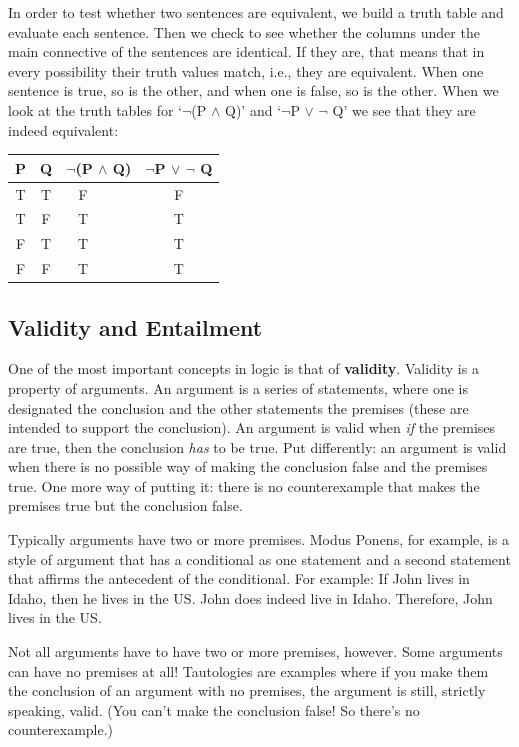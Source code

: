 \documentclass[]{tufte-book}
\begin{document}
In order to test whether two sentences are equivalent, we build a truth table and evaluate each sentence. Then we check to see whether the columns under the main connective of the sentences are identical. If they are, that means that in every possibility their truth values match, i.e., they are equivalent. When one sentence is true, so is the other, and when one is false, so is the other. When we look at the truth tables for `\(\neg\)(P \(\wedge\) Q)' and `\(\neg\)P \(\vee\) \(\neg\) Q' we see that they are indeed equivalent:

\begin{longtable}[]{@{}cccc@{}}
\toprule
P & Q & \(\neg\)(P \(\wedge\) Q) & \(\neg\)P \(\vee\) \(\neg\) Q\tabularnewline
\midrule
\endhead
T & T & F\(~~~~~~~~~~\) & F\tabularnewline
T & F & T\(~~~~~~~~~~\) & T\tabularnewline
F & T & T\(~~~~~~~~~~\) & T\tabularnewline
F & F & T\(~~~~~~~~~~\) & T\tabularnewline
\bottomrule
\end{longtable}

\hypertarget{validity-and-entailment}{%
\subsection{Validity and Entailment}\label{validity-and-entailment}}

One of the most important concepts in logic is that of \textbf{validity}. Validity is a property of arguments. An argument is a series of statements, where one is designated the conclusion and the other statements the premises (these are intended to support the conclusion). An argument is valid when \emph{if} the premises are true, then the conclusion \emph{has} to be true. Put differently: an argument is valid when there is no possible way of making the conclusion false and the premises true. One more way of putting it: there is no counterexample that makes the premises true but the conclusion false.

Typically arguments have two or more premises. Modus Ponens, for example, is a style of argument that has a conditional as one statement and a second statement that affirms the antecedent of the conditional. For example: If John lives in Idaho, then he lives in the US. John does indeed live in Idaho. Therefore, John lives in the US.

Not all arguments have to have two or more premises, however. Some arguments can have no premises at all! Tautologies are examples where if you make them the conclusion of an argument with no premises, the argument is still, strictly speaking, valid. (You can't make the conclusion false! So there's no counterexample.)
\end{document}
